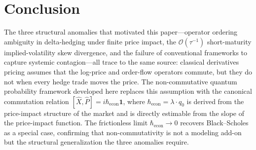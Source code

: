 
\section{Conclusion}\label{sec:discussion}

The three structural anomalies that motivated this paper---operator ordering
ambiguity in delta-hedging under finite price impact, the
$\mathcal{O}(\tau^{-1})$ short-maturity implied-volatility skew divergence,
and the failure of conventional frameworks to capture systemic contagion---all
trace to the same source: classical derivatives pricing assumes that the
log-price and order-flow operators commute, but they do not when every hedge
trade moves the price. The non-commutative quantum probability framework
developed here replaces this assumption with the canonical commutation relation
$[\hat{X}, \hat{P}] = i\hbar_{\mathrm{econ}}\mathbf{1}$, where
$\hbar_{\mathrm{econ}} = \lambda \cdot q_0$ is derived from the price-impact
structure of the market and is directly estimable from the slope of the
price-impact function. The frictionless limit $\hbar_{\mathrm{econ}} \to 0$
recovers Black--Scholes as a special case, confirming that non-commutativity
is not a modeling add-on but the structural generalization the three anomalies
require.

